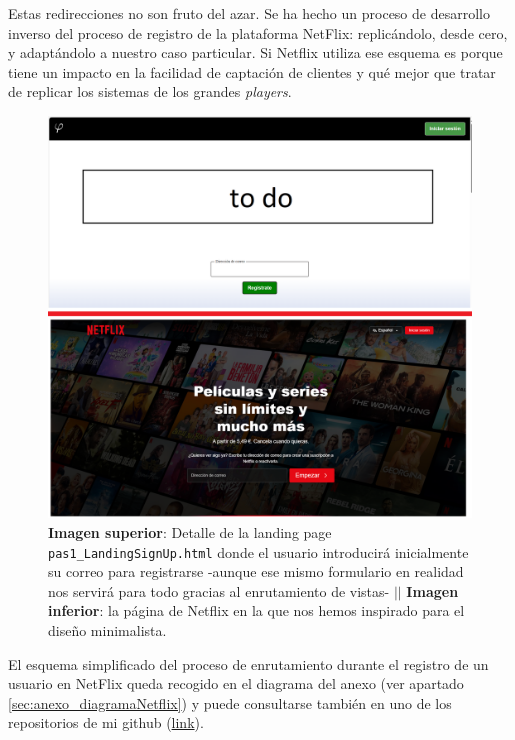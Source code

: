 \documentclass[a4paper,12pt]{report}
\begin{document}
	

	
	Estas redirecciones no son fruto del azar. Se ha hecho un proceso de desarrollo inverso del proceso de registro de la plataforma NetFlix: replicándolo, desde cero, y adaptándolo a nuestro caso particular. Si Netflix utiliza ese esquema es porque tiene un impacto en la facilidad de captación de clientes y qué mejor que tratar de replicar los sistemas de los grandes \textit{players}.
	
	\setlength{\belowcaptionskip}{3pt}
	\FloatBarrier
	\begin{figure}[H]
		\centering
		\includegraphics[width=1\textwidth]{img/landingSignUp.png}
		\caption{\textbf{Imagen superior}: Detalle de la landing page \texttt{pas1\_LandingSignUp.html} donde el usuario introducirá inicialmente su correo para registrarse -aunque ese mismo formulario en realidad nos servirá para todo gracias al enrutamiento de vistas- $||$ \textbf{Imagen inferior}: la página de Netflix en la que nos hemos inspirado para el diseño minimalista.}
		\label{fig:landingSignUpDETALL} 
	\end{figure}
	\FloatBarrier
	
	El esquema simplificado del proceso de enrutamiento durante el registro de un usuario en NetFlix queda recogido en el diagrama del anexo (ver apartado \ref{sec:anexo_diagramaNetflix}) y puede consultarse también en uno de los repositorios de mi github (\href{https://www.github.com/miApp}{link}). 
	
\end{document}
